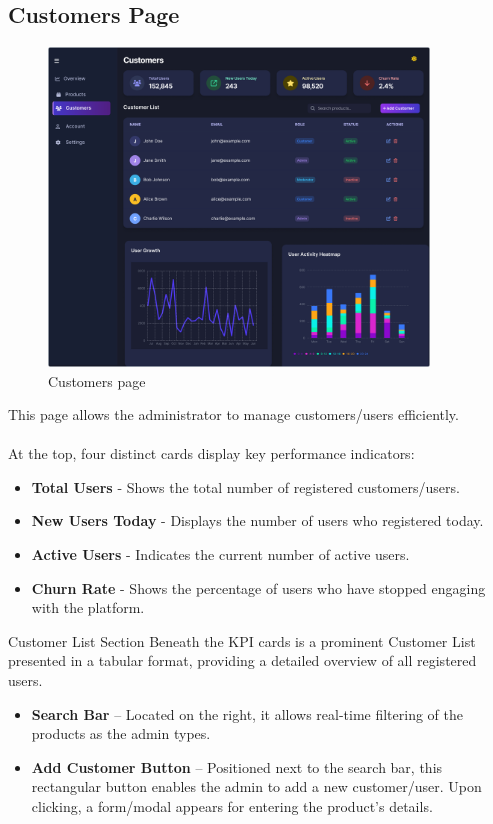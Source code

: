 \documentclass[11pt,a4paper]{article}
\begin{document}
	\subsection{Customers Page}\label{subsec:customers-page}
	\begin{figure}[h]
		\centering
		\includegraphics[width=0.9\textwidth]{pictures/admin/Customers_Admin}
		\caption{Customers page}\label{fig:figure3}
	\end{figure}
	This page allows the administrator to manage customers/users efficiently. \\ \\
	At the top, four distinct cards display key performance indicators:
	\begin{itemize}
		\item \textbf{Total Users} - Shows the total number of registered customers/users.
		\item \textbf{New Users Today} - Displays the number of users who registered today.
		\item \textbf{Active Users} - Indicates the current number of active users.
		\item \textbf{Churn Rate} - Shows the percentage of users who have stopped engaging with the platform.
	\end{itemize}
	Customer List Section
	Beneath the KPI cards is a prominent Customer List presented in a tabular format, providing a detailed overview of all registered users.
	\begin{itemize}
		\item \textbf{Search Bar} – Located on the right, it allows real-time filtering of the products as the admin types.
		\item \textbf{Add Customer Button} – Positioned next to the search bar, this rectangular button enables the admin to add a new customer/user. Upon clicking, a form/modal appears for entering the product’s details.
	\end{itemize}
\end{document}
